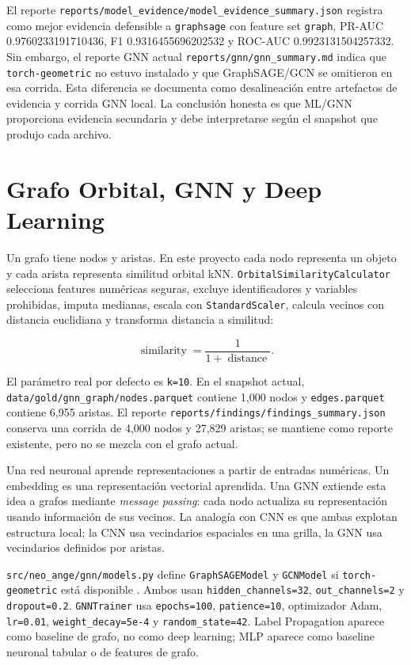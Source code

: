 \documentclass[12pt,a4paper]{report}
\newcommand{\code}[1]{\texttt{#1}}
\DeclareRobustCommand{\filepath}[1]{\nolinkurl{#1}}
\begin{document}
El reporte \filepath{reports/model_evidence/model_evidence_summary.json} registra como mejor evidencia defensible a \code{graphsage} con feature set \code{graph}, PR-AUC 0.9760233191710436, F1 0.9316455696202532 y ROC-AUC 0.9923131504257332. Sin embargo, el reporte GNN actual \filepath{reports/gnn/gnn_summary.md} indica que \code{torch-geometric} no estuvo instalado y que GraphSAGE/GCN se omitieron en esa corrida. Esta diferencia se documenta como desalineación entre artefactos de evidencia y corrida GNN local. La conclusión honesta es que ML/GNN proporciona evidencia secundaria y debe interpretarse según el snapshot que produjo cada archivo.

\chapter{Grafo Orbital, GNN y Deep Learning}

Un grafo tiene nodos y aristas. En este proyecto cada nodo representa un objeto y cada arista representa similitud orbital kNN. \code{OrbitalSimilarityCalculator} selecciona features numéricas seguras, excluye identificadores y variables prohibidas, imputa medianas, escala con \code{StandardScaler}, calcula vecinos con distancia euclidiana y transforma distancia a similitud:

\[
\operatorname{similarity} = \frac{1}{1+\operatorname{distance}}.
\]

El parámetro real por defecto es \code{k=10}. En el snapshot actual, \filepath{data/gold/gnn_graph/nodes.parquet} contiene 1,000 nodos y \filepath{edges.parquet} contiene 6,955 aristas. El reporte \filepath{reports/findings/findings_summary.json} conserva una corrida de 4,000 nodos y 27,829 aristas; se mantiene como reporte existente, pero no se mezcla con el grafo actual.

Una red neuronal aprende representaciones a partir de entradas numéricas. Un embedding es una representación vectorial aprendida. Una GNN extiende esta idea a grafos mediante \emph{message passing}: cada nodo actualiza su representación usando información de sus vecinos. La analogía con CNN es que ambas explotan estructura local; la CNN usa vecindarios espaciales en una grilla, la GNN usa vecindarios definidos por aristas.

\filepath{src/neo_ange/gnn/models.py} define \code{GraphSAGEModel} y \code{GCNModel} si \code{torch-geometric} está disponible \cite{pytorch_geometric_docs}. Ambos usan \code{hidden\_channels=32}, \code{out\_channels=2} y \code{dropout=0.2}. \code{GNNTrainer} usa \code{epochs=100}, \code{patience=10}, optimizador Adam, \code{lr=0.01}, \code{weight\_decay=5e-4} y \code{random\_state=42}. Label Propagation aparece como baseline de grafo, no como deep learning; MLP aparece como baseline neuronal tabular o de features de grafo.
\end{document}
